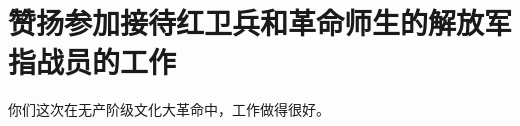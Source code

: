 \section[赞扬参加接待红卫兵和革命师生的解放军指战员的工作（一九六六年十二月）]{赞扬参加接待红卫兵和革命师生的解放军指战员的工作}


你们这次在无产阶级文化大革命中，工作做得很好。



